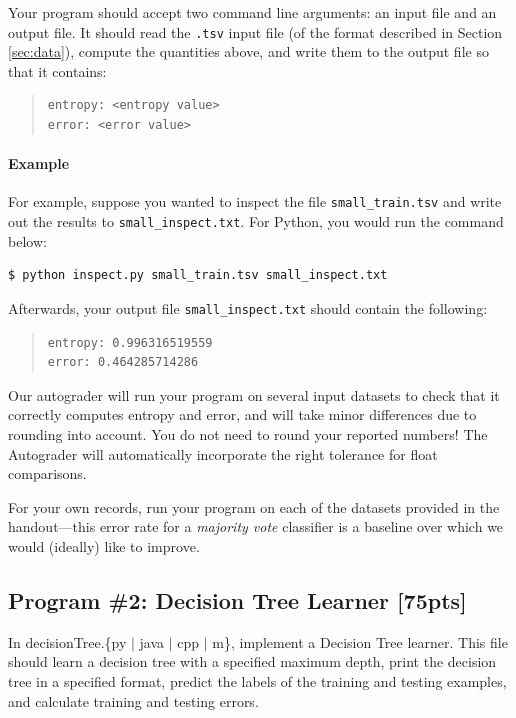 \documentclass[11pt]{article}
\numberwithin{equation}{section} %
\numberwithin{figure}{section} %
\numberwithin{table}{section} %
\begin{document}
Your program should accept two command line arguments: an input file and an output file. It should read the \lstinline{.tsv} input file (of the format described in Section \ref{sec:data}), compute the quantities above, and write them to the output file so that it contains:
\begin{quote}
\begin{verbatim}
entropy: <entropy value>
error: <error value>
\end{verbatim}
\end{quote}

\paragraph{Example}

For example, suppose you wanted to inspect the file \lstinline{small_train.tsv} and write out the results to \lstinline{small_inspect.txt}. For Python, you would run the command below:
%
\begin{lstlisting}[language=Shell]
$ python inspect.py small_train.tsv small_inspect.txt
\end{lstlisting}
%
Afterwards, your output file \lstinline{small_inspect.txt} should contain the following:
%
\begin{quote}
\begin{verbatim}
entropy: 0.996316519559
error: 0.464285714286
\end{verbatim}
\end{quote}
%
Our autograder will run your program on several input datasets to check that it correctly computes entropy and error, and will take minor differences due to rounding into account. You do not need to round your reported numbers! The Autograder will automatically incorporate the right tolerance for float comparisons.

\begin{notebox}
For your own records, run your program on each of the datasets provided in the handout---this error rate for a \emph{majority vote} classifier is a baseline over which we would (ideally) like to improve.
\end{notebox}

\newpage
\subsection{Program \#2: Decision Tree Learner [75pts]}
\label{sec:decisiontree}

In decisionTree.\{py $\mid$ java $\mid$ cpp $\mid$ m\}, implement a Decision Tree learner. This file should learn a decision tree with a specified maximum depth, print the decision tree in a specified format, predict the labels of the training and testing examples, and calculate training and testing errors.
\end{document}
